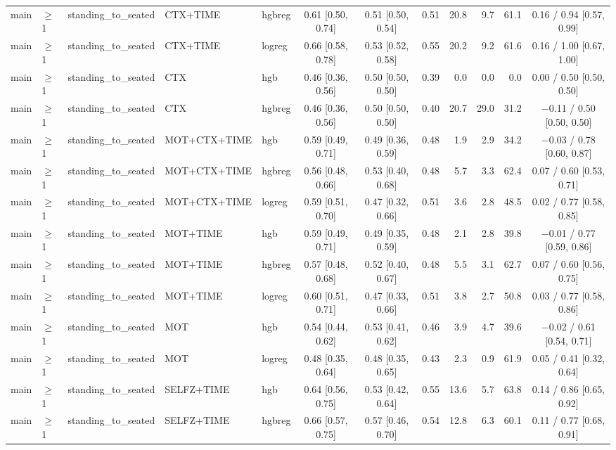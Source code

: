 \begin{longtable}{@{}lllllcccrrrc@{}}
main & $\geq$1 & standing\_to\_seated & CTX+TIME & hgbreg & 0.61 [0.50, 0.74] & 0.51 [0.50, 0.54] & 0.51 & 20.8 & 9.7 & 61.1 & 0.16 / 0.94 [0.57, 0.99] \\
main & $\geq$1 & standing\_to\_seated & CTX+TIME & logreg & 0.66 [0.58, 0.78] & 0.53 [0.52, 0.58] & 0.55 & 20.2 & 9.2 & 61.6 & 0.16 / 1.00 [0.67, 1.00] \\
main & $\geq$1 & standing\_to\_seated & CTX & hgb & 0.46 [0.36, 0.56] & 0.50 [0.50, 0.50] & 0.39 & 0.0 & 0.0 & 0.0 & 0.00 / 0.50 [0.50, 0.50] \\
main & $\geq$1 & standing\_to\_seated & CTX & hgbreg & 0.46 [0.36, 0.56] & 0.50 [0.50, 0.50] & 0.40 & 20.7 & 29.0 & 31.2 & $-$0.11 / 0.50 [0.50, 0.50] \\
main & $\geq$1 & standing\_to\_seated & MOT+CTX+TIME & hgb & 0.59 [0.49, 0.71] & 0.49 [0.36, 0.59] & 0.48 & 1.9 & 2.9 & 34.2 & $-$0.03 / 0.78 [0.60, 0.87] \\
main & $\geq$1 & standing\_to\_seated & MOT+CTX+TIME & hgbreg & 0.56 [0.48, 0.66] & 0.53 [0.40, 0.68] & 0.48 & 5.7 & 3.3 & 62.4 & 0.07 / 0.60 [0.53, 0.71] \\
main & $\geq$1 & standing\_to\_seated & MOT+CTX+TIME & logreg & 0.59 [0.51, 0.70] & 0.47 [0.32, 0.66] & 0.51 & 3.6 & 2.8 & 48.5 & 0.02 / 0.77 [0.58, 0.85] \\
main & $\geq$1 & standing\_to\_seated & MOT+TIME & hgb & 0.59 [0.49, 0.71] & 0.49 [0.35, 0.59] & 0.48 & 2.1 & 2.8 & 39.8 & $-$0.01 / 0.77 [0.59, 0.86] \\
main & $\geq$1 & standing\_to\_seated & MOT+TIME & hgbreg & 0.57 [0.48, 0.68] & 0.52 [0.40, 0.67] & 0.48 & 5.5 & 3.1 & 62.7 & 0.07 / 0.60 [0.56, 0.75] \\
main & $\geq$1 & standing\_to\_seated & MOT+TIME & logreg & 0.60 [0.51, 0.71] & 0.47 [0.33, 0.66] & 0.51 & 3.8 & 2.7 & 50.8 & 0.03 / 0.77 [0.58, 0.86] \\
main & $\geq$1 & standing\_to\_seated & MOT & hgb & 0.54 [0.44, 0.62] & 0.53 [0.41, 0.62] & 0.46 & 3.9 & 4.7 & 39.6 & $-$0.02 / 0.61 [0.54, 0.71] \\
main & $\geq$1 & standing\_to\_seated & MOT & logreg & 0.48 [0.35, 0.64] & 0.48 [0.35, 0.65] & 0.43 & 2.3 & 0.9 & 61.9 & 0.05 / 0.41 [0.32, 0.64] \\
main & $\geq$1 & standing\_to\_seated & SELFZ+TIME & hgb & 0.64 [0.56, 0.75] & 0.53 [0.42, 0.64] & 0.55 & 13.6 & 5.7 & 63.8 & 0.14 / 0.86 [0.65, 0.92] \\
main & $\geq$1 & standing\_to\_seated & SELFZ+TIME & hgbreg & 0.66 [0.57, 0.75] & 0.57 [0.46, 0.70] & 0.54 & 12.8 & 6.3 & 60.1 & 0.11 / 0.77 [0.68, 0.91] \\

\end{longtable}
